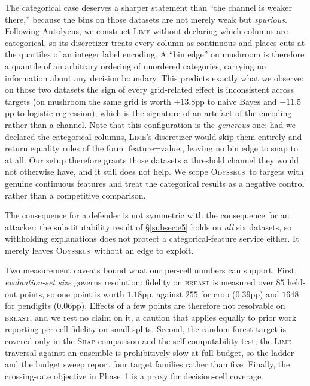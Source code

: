 \documentclass[sigconf,anonymous,review]{acmart}
\newcommand{\sys}{\textsc{Odysseus}}
\begin{document}
The categorical case deserves a sharper statement than ``the channel is weaker there,'' because the
bins on those datasets are not merely weak but \emph{spurious}. Following Autolycus, we construct
\textsc{Lime} without declaring which columns are categorical, so its discretizer treats every column
as continuous and places cuts at the quartiles of an integer label encoding. A ``bin edge'' on
mushroom is therefore a quantile of an arbitrary ordering of unordered categories, carrying no
information about any decision boundary. This predicts exactly what we observe: on those two datasets
the sign of every grid-related effect is inconsistent across targets (on mushroom the same grid is worth $+13.8$pp to naive Bayes and $-11.5$pp to logistic regression), which is the signature of an
artefact of the encoding rather than a channel. Note that this configuration is the
\emph{generous} one: had we declared the categorical columns, \textsc{Lime}'s discretizer would skip
them entirely and return equality rules of the form $\text{feature}{=}\text{value}$, leaving no bin
edge to snap to at all. Our setup therefore grants those datasets a threshold channel they would not
otherwise have, and it still does not help. We scope \sys\ to targets with genuine continuous
features and treat the categorical results as a negative control rather than a competitive
comparison.

The consequence for a defender is not symmetric with the consequence for an attacker: the
substitutability result of \S\ref{subsec:e5} holds on \emph{all} six datasets, so withholding
explanations does not protect a categorical-feature service either. It merely leaves \sys\ without an
edge to exploit.

Two measurement caveats bound what our per-cell numbers can support. First, \emph{evaluation-set size}
governs resolution: fidelity on \textsc{breast} is measured over $85$ held-out points, so one point is
worth $1.18$pp, against $255$ for crop ($0.39$pp) and $1648$ for pendigits ($0.06$pp). Effects of a few
points are therefore not resolvable on \textsc{breast}, and we rest no claim on it, a caution that
applies equally to prior work reporting per-cell fidelity on small splits. Second, the random forest
target is covered only in the \textsc{Shap} comparison and the self-computability test; the
\textsc{Lime} traversal against an ensemble is prohibitively slow at full budget, so the ladder and the
budget sweep report four target families rather than five. Finally, the crossing-rate objective in
Phase~1 is a proxy for decision-cell coverage.
\end{document}
